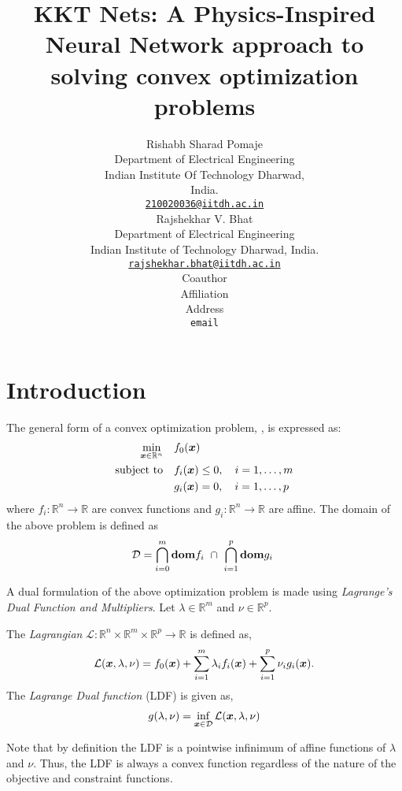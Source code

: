 \documentclass{article} %
\title{KKT Nets: A Physics-Inspired Neural Network approach to solving convex optimization problems}
\author{Rishabh Sharad Pomaje \\
Department of Electrical Engineering\\
Indian Institute Of Technology Dharwad,\\
India.\\
\texttt{\href{mailto:210020036@iitdh.ac.in}{210020036@iitdh.ac.in}} \\
\And
Rajshekhar V. Bhat\\
Department of Electrical Engineering \\
Indian Institute of Technology Dharwad, 
India.\\
\texttt{\href{mailto:rajshekhar.bhat@iitdh.ac.in}{rajshekhar.bhat@iitdh.ac.in}} \\
\AND
Coauthor \\
Affiliation \\
Address \\
\texttt{email}
}
\begin{document}
\maketitle

\begin{abstract}
   \lipsum[15]
\end{abstract}

\section{Introduction}
The general form of a convex optimization problem, \cite{Boyd_Vandenberghe_2004}, is expressed as:
\begin{subequations}
\begin{align}
\min_{{\bm{x}} \in \mathbb{R}^n} \quad & f_0({\bm{x}}) \\
\text{subject to} \quad & f_i({\bm{x}})  \leq 0, \quad i = 1, \ldots, m \\
& g_i({\bm{x}}) = 0, \quad i = 1, \ldots, p
\end{align}
\end{subequations}
where $f_i: \mathbb{R}^n \rightarrow \mathbb{R}$ are convex functions and  $g_i: \mathbb{R}^n \rightarrow \mathbb{R}$ are affine. The domain of the above problem is defined as 
\begin{align}
   \mathcal{D} = \bigcap_{i=0}^{m} \text{\textbf{dom}}f_i\ \cap\ \bigcap_{i=1}^{p} \text{\textbf{dom}}g_i\ 
\end{align}

A dual formulation of the above optimization problem is made using \emph{Lagrange's Dual Function and Multipliers}. Let $\lambda \in \mathbb{R}^m$ and $\nu \in \mathbb{R}^p$. 

The \emph{Lagrangian} $\mathcal{L}: \mathbb{R}^n \times \mathbb{R}^m \times \mathbb{R}^p \rightarrow \mathbb{R}$ is defined as, 
\begin{align}
   \mathcal{L}({\bm{x}}, \lambda, \nu) = f_0({\bm{x}}) + \sum_{i=1}^{m} \lambda_i f_i({\bm{x}}) + \sum_{i=1}^{p} \nu_i g_i({\bm{x}}).
\end{align} 
The \emph{Lagrange Dual function} (LDF) is given as,
\begin{align}
   g(\lambda, \nu) = \inf_{{\bm{x}} \in \mathcal{D}} \mathcal{L}({\bm{x}}, \lambda, \nu)
\end{align}

Note that by definition the LDF is a pointwise infinimum of affine functions of $\lambda$ and $\nu$. Thus, the LDF is always a convex function regardless of the nature of the objective and constraint functions.  
\end{document}

